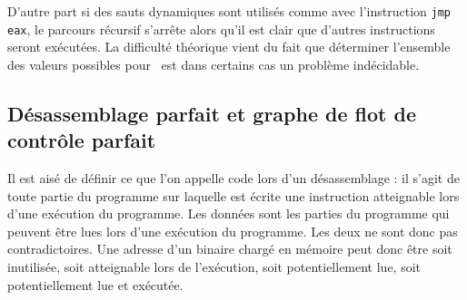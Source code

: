 D'autre part si des sauts dynamiques sont utilisés comme avec l'instruction \texttt{jmp eax}, le parcours récursif s'arrête alors qu'il est clair que d'autres instructions seront exécutées.
La difficulté théorique vient du fait que déterminer l'ensemble des valeurs possibles pour \eax\ est dans certains cas un problème indécidable.





\subsection{Désassemblage parfait et graphe de flot de contrôle parfait}
Il est aisé de définir ce que l'on appelle code lors d'un désassemblage : il s'agit de toute partie du programme sur laquelle est écrite une instruction atteignable lors d'une exécution du programme.
Les données sont les parties du programme qui peuvent être lues lors d'une exécution du programme. Les deux ne sont donc pas contradictoires. Une adresse d'un binaire chargé en mémoire peut donc être soit inutilisée, soit atteignable lors de l'exécution, soit potentiellement lue, soit potentiellement lue et exécutée.

\begin{center}
\end{center}

